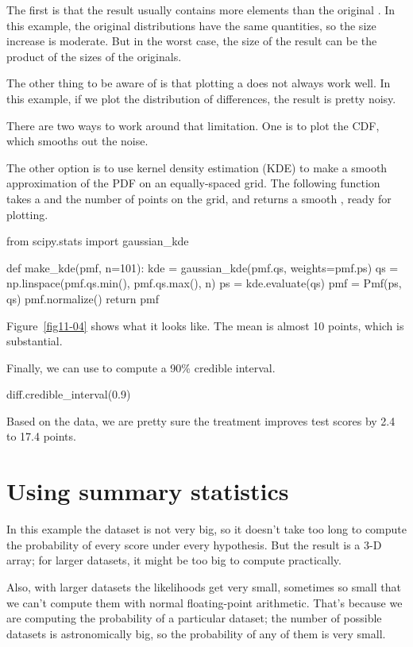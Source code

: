 \documentclass[12pt]{book}
\theoremstyle{exercise}
\begin{document}
The first is that the result usually contains more elements than the
original .
In this example, the original distributions have the same quantities, so
the size increase is moderate.
But in the worst case, the size of the result can be the product of the
sizes of the originals.

The other thing to be aware of is that plotting a
 does not always work well. In this
example, if we plot the distribution of differences, the result is
pretty noisy.

There are two ways to work around that limitation. One is to plot the
CDF, which smooths out the noise.

The other option is to use kernel density estimation (KDE) to make a
smooth approximation of the PDF on an equally-spaced grid.
The following function takes a  and the number of points on the grid, and returns a smooth , ready for plotting.

\begin{code}
from scipy.stats import gaussian_kde

def make_kde(pmf, n=101):
    kde = gaussian_kde(pmf.qs, weights=pmf.ps)
    qs = np.linspace(pmf.qs.min(), pmf.qs.max(), n)
    ps = kde.evaluate(qs)
    pmf = Pmf(ps, qs)
    pmf.normalize()
    return pmf
\end{code}

Figure~\ref{fig11-04} shows what it looks like.
The mean is almost 10 points, which is substantial.

Finally, we can use  to
compute a 90\% credible interval.

\begin{code}
diff.credible_interval(0.9)
\end{code}

Based on the data, we are pretty sure the treatment improves test scores
by 2.4 to 17.4 points.

\section{Using summary statistics}

In this example the dataset is not very big, so it doesn't take too long
to compute the probability of every score under every hypothesis. But
the result is a 3-D array; for larger datasets, it might be too big to
compute practically.

Also, with larger datasets the likelihoods get very small, sometimes so
small that we can't compute them with normal floating-point arithmetic.
That's because we are computing the probability of a particular dataset;
the number of possible datasets is astronomically big, so the
probability of any of them is very small.
\end{document}
